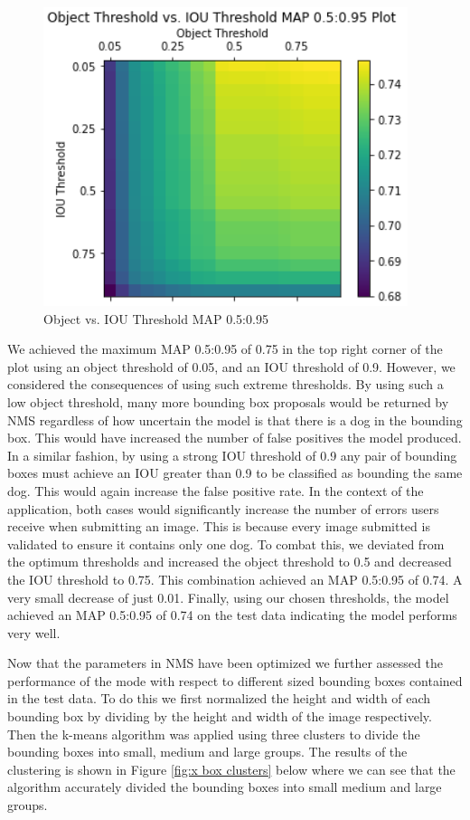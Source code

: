 \documentclass{article}
\begin{document}
\begin{figure}[h]
\centering
	\includegraphics[scale=0.7]{final-report-images/map0.5to0.95.png}
\caption{Object vs. IOU Threshold MAP 0.5:0.95}
\label{fig:x object v iou}
\end{figure}
\newpage
\noindent We achieved the maximum MAP 0.5:0.95 of 0.75 in the top right corner of the plot using an object threshold of 0.05, and an IOU threshold of 0.9.  However, we considered the consequences of using such extreme thresholds.  By using such a low object threshold, many more bounding box proposals would be returned by NMS regardless of how uncertain the model is that there is a dog in the bounding box.  This would have increased the number of false positives the model produced.  In a similar fashion, by using a strong IOU threshold of 0.9 any pair of bounding boxes must achieve an IOU greater than 0.9 to be classified as bounding the same dog.  This would again increase the false positive rate.  In the context of the application, both cases would significantly increase the number of errors users receive when submitting an image.  This is because every image submitted is validated to ensure it contains only one dog.  To combat this, we deviated from the optimum thresholds and increased the object threshold to 0.5 and decreased the IOU threshold to 0.75.  This combination achieved an MAP 0.5:0.95 of 0.74.  A very small decrease of just 0.01.  Finally, using our chosen thresholds, the model achieved an MAP 0.5:0.95 of 0.74 on the test data indicating the model performs very well.

Now that the parameters in NMS have been optimized we further assessed the performance of the mode with respect to different sized bounding boxes contained in the test data.  To do this we first normalized the height and width of each bounding box by dividing by the height and width of the image respectively.  Then the k-means algorithm was applied using three clusters to divide the bounding boxes into small, medium and large groups.  The results of the clustering is shown in Figure \ref{fig:x box clusters} below where we can see that the algorithm accurately divided the bounding boxes into small medium and large groups.
\end{document}
